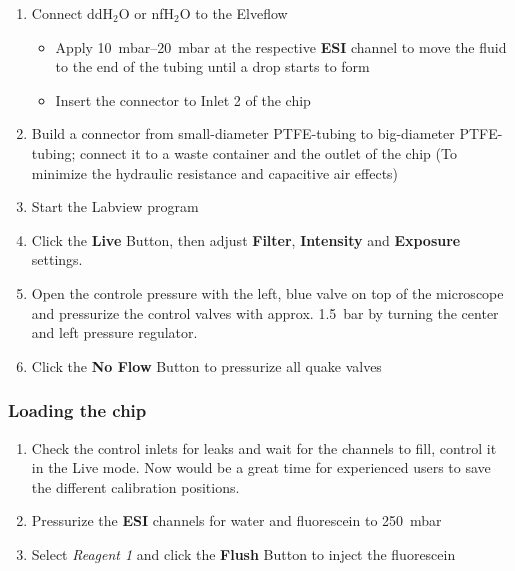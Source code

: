 \documentclass{article}
\newcounter{ListCounter}
\begin{document}
\begin{enumerate}
	\item Connect ddH$_{2}$O or nfH$_{2}$O to the Elveflow		\begin{itemize}
		\item Apply \SIrange{10}{20}{\milli\bar} at the respective \textbf{ESI} channel to move the fluid to the end of the tubing until a drop starts to form
		\item  Insert the connector to Inlet 2 of the chip
	\end{itemize}
	\item Build a connector from small-diameter PTFE-tubing to big-diameter PTFE-tubing; connect it to a waste container and the outlet of the chip (To minimize the hydraulic resistance and capacitive air effects)
	\item Start the Labview program
	\item Click the \textbf{Live} Button, then adjust \textbf{Filter}, \textbf{Intensity} and \textbf{Exposure} settings.
	\item Open the controle pressure with the left, blue valve on top of the microscope and pressurize the control valves with approx. \SI{1.5}{\bar} by turning the center and left pressure regulator.
	\item Click the \textbf{No Flow} Button to pressurize all quake valves
	\setcounter{ListCounter}{\value{enumi}}
		\end{enumerate}
	
	\subsubsection{Loading the chip}
		\begin{enumerate}
			\setcounter{enumi}{\value{ListCounter}}
	\item Check the control inlets for leaks and wait for the channels to fill, control it in the Live mode. Now would be a great time for experienced users to save the different calibration positions.
	\item Pressurize the \textbf{ESI} channels for water and fluorescein to \SI{250}{\milli\bar}
	\item Select \textit{Reagent 1} and click the \textbf{Flush} Button to inject the fluorescein
		\setcounter{ListCounter}{\value{enumi}}
	\end{enumerate}
		
\end{document}
